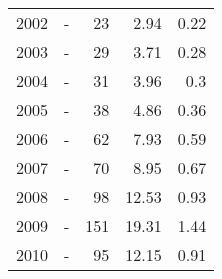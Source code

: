\begin{longtable}{lXrrr}
        2002 & \multicolumn{1}{X}{-} & %
          \num{23} &
          \num[round-mode=places,round-precision=2]{2.94} &
          \num[round-mode=places,round-precision=2]{0.22} \\

        2003 & \multicolumn{1}{X}{-} & %
          \num{29} &
          \num[round-mode=places,round-precision=2]{3.71} &
          \num[round-mode=places,round-precision=2]{0.28} \\

        2004 & \multicolumn{1}{X}{-} & %
          \num{31} &
          \num[round-mode=places,round-precision=2]{3.96} &
          \num[round-mode=places,round-precision=2]{0.3} \\

        2005 & \multicolumn{1}{X}{-} & %
          \num{38} &
          \num[round-mode=places,round-precision=2]{4.86} &
          \num[round-mode=places,round-precision=2]{0.36} \\

        2006 & \multicolumn{1}{X}{-} & %
          \num{62} &
          \num[round-mode=places,round-precision=2]{7.93} &
          \num[round-mode=places,round-precision=2]{0.59} \\

        2007 & \multicolumn{1}{X}{-} & %
          \num{70} &
          \num[round-mode=places,round-precision=2]{8.95} &
          \num[round-mode=places,round-precision=2]{0.67} \\

        2008 & \multicolumn{1}{X}{-} & %
          \num{98} &
          \num[round-mode=places,round-precision=2]{12.53} &
          \num[round-mode=places,round-precision=2]{0.93} \\

        2009 & \multicolumn{1}{X}{-} & %
          \num{151} &
          \num[round-mode=places,round-precision=2]{19.31} &
          \num[round-mode=places,round-precision=2]{1.44} \\

        2010 & \multicolumn{1}{X}{-} & %
          \num{95} &
          \num[round-mode=places,round-precision=2]{12.15} &
          \num[round-mode=places,round-precision=2]{0.91} \\


\end{longtable}
